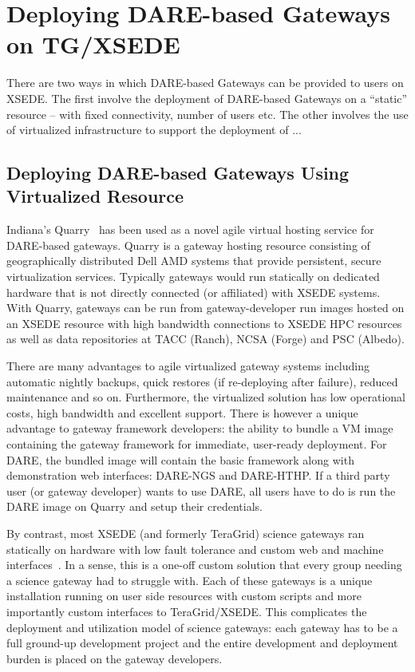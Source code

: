 \documentclass[]{svjour3}
\begin{document}
%

\section{Deploying DARE-based Gateways on TG/XSEDE}

There are two ways in which DARE-based Gateways can be provided to
users on XSEDE. The first involve the deployment of DARE-based
Gateways on a ``static'' resource -- with fixed connectivity, number
of users etc. The other involves the use of virtualized infrastructure
to support the deployment of ...

\subsection{Deploying DARE-based Gateways Using Virtualized Resource}
Indiana's Quarry~\cite{quarry} has been used as a novel agile virtual hosting
service for DARE-based gateways. Quarry is a gateway hosting resource
consisting of
geographically distributed Dell AMD systems that provide persistent,
secure virtualization services. Typically gateways would run
statically on dedicated hardware that is not directly connected (or
affiliated) with XSEDE systems. With Quarry, gateways can be run from
gateway-developer run images hosted on an XSEDE resource with high
bandwidth connections to XSEDE HPC resources as well as data
repositories at TACC (Ranch), NCSA (Forge) and PSC (Albedo).

There are many advantages to agile virtualized gateway systems
including automatic nightly backups, quick restores (if re-deploying
after failure), reduced maintenance and so on. Furthermore, the
virtualized solution has low operational costs, high bandwidth and
excellent support. There is however a unique advantage to gateway
framework developers: the ability to bundle a VM image containing the
gateway framework for immediate, user-ready deployment.  For DARE, the
bundled image will contain the basic framework along with
demonstration web interfaces: DARE-NGS and DARE-HTHP. If a third party
user (or gateway developer) wants to use DARE, all users have to do is
run the DARE image on Quarry and setup their credentials.

By contrast, most XSEDE (and formerly TeraGrid) science gateways ran
statically on hardware with low fault tolerance and custom web and
machine interfaces~\cite{xsedegateways}. In a
sense, this is a one-off custom solution that every group needing a
science gateway had to struggle with. Each of these gateways is a
unique installation running on user side resources with custom scripts
and more importantly custom interfaces to TeraGrid/XSEDE.  This
complicates the deployment and utilization model of science gateways:
each gateway has to be a full ground-up development project and the
entire development and deployment burden is placed on the gateway
developers.
\end{document}
